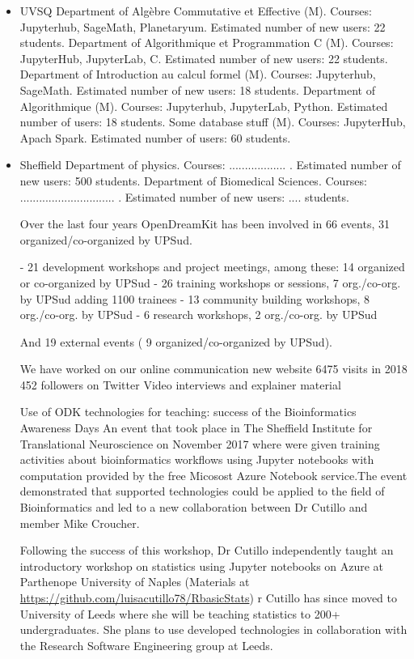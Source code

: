 \begin{Aim 1}
\begin{Aim 2}
\begin{itemize}
 \item  UVSQ
 Department of Algèbre Commutative et Effective (M). Courses: Jupyterhub, SageMath, Planetaryum. Estimated number of new users: 22 students.
 Department of Algorithmique et Programmation C (M). Courses: JupyterHub, JupyterLab, C. Estimated number of new users: 22 students.
 Department of Introduction au calcul formel (M). Courses: Jupyterhub, SageMath. Estimated number of new users: 18 students.
 Department of Algorithmique (M). Courses: Jupyterhub, JupyterLab, Python. Estimated number of users: 18 students.
 Some database stuff (M). Courses: JupyterHub, Apach Spark. Estimated number of users: 60 students. 

\item  Sheffield
 Department of physics. Courses: .................. . Estimated number of new users: 500 students.
 Department of Biomedical Sciences. Courses: .............................. . Estimated number of new users: .... students.


Over the last four years OpenDreamKit has been involved in 66 events, 31 organized/co-organized by UPSud.

                        - 21 development workshops and project meetings, among these: 14 organized or co-organized by UPSud
                        - 26 training workshops or sessions,  7 org./co-org. by UPSud adding 1100 trainees
                        - 13 community building workshops, 8 org./co-org. by UPSud
                        - 6 research workshops, 2 org./co-org. by UPSud

And 19 external events ( 9 organized/co-organized by UPSud).

We have worked on our online communication
        new website
        6475 visits in 2018
        452 followers on Twitter
        Video interviews and explainer material
        
  Use of ODK technologies for teaching: success of the Bioinformatics Awareness Days
An event that took place in The Sheffield Institute for Translational Neuroscience on November 2017 where were given training activities 
about bioinformatics workflows using Jupyter notebooks with computation provided by the free Micosost Azure Notebook service.The event 
demonstrated that \ODK supported technologies could be applied to the field of Bioinformatics and led to a new collaboration between Dr 
Cutillo and \ODK member Mike Croucher.

Following the success of this workshop, Dr Cutillo independently taught an introductory workshop on statistics using Jupyter notebooks 
on Azure at Parthenope University of Naples (Materials at \url{https://github.com/luisacutillo78/RbasicStats}) r Cutillo has since moved 
to University of Leeds where she will be teaching statistics to 200+ undergraduates. She plans to use \ODK developed technologies 
in collaboration with the Research Software Engineering group at Leeds.


\end{itemize}
\end{Aim 2}
\end{Aim 1}
